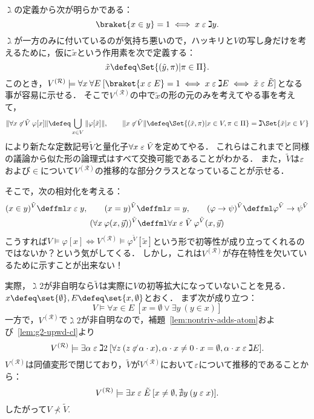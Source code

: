 \documentclass[realisability.tex]{subfiles}
\begin{document}
\begin{remark}
 $\gimel$の定義から次が明らかである：
 \[
  \braket{x \in y} = 1 \iff x \strin \gimel y.
 \]
 $\gimel$が一方のみに付いているのが気持ち悪いので，ハッキリと$V$の写し身だけを考えるために，仮に$\tilde{x}$という作用素を次で定義する：
 \[
  \tilde{x} \defeq \Set{ (\tilde{y}, \pi) | \pi \in \Pi }.
 \]
 このとき，$V^{(\mathcal{R})} \models \forall x \: \forall E \: [\braket{x \strin E} = 1 \iff x \strin \gimel E \iff \tilde{x} \strin \tilde{E}]$となる事が容易に示せる．
 そこで$V^{(\mathcal{R})}$の中で$\tilde{x}$の形の元のみを考えてやる事を考えて，
 \[
  \|\forall x \strnin \tilde{V} \: \varphi[x]\| \defeq
  \bigcup_{x \in V} \|\varphi[\tilde{x}]\|, \qquad
  \| x \strnin \tilde{V}\| \defeq \Set{ (\tilde{x}, \pi) | x \in V, \pi \in \Pi}
  = \gimel\Set{\tilde{x} | x \in V}
 \]
 により新たな定数記号$\tilde{V}$と量化子$\forall x \mathrel{\varepsilon} \tilde{V}$を定めてやる．
 これらはこれまでと同様の議論から似た形の論理式はすべて交換可能であることがわかる．
 また，$\tilde{V}$は$\mathrel{\varepsilon}$および$\in$について$V^{(\mathcal{R})}$の推移的な部分クラスとなっていることが示せる．

 そこで，次の相対化を考える：
 \begin{gather*}
  (x \in y)^{\tilde{V}} \deffml x \strin y, \qquad
  (x = y)^{\tilde{V}} \deffml x = y, \qquad
  (\varphi \to \psi)^{\tilde{V}} \deffml \varphi^{\tilde{V}} \to \psi^{\tilde{V}} \\
  (\forall x \: \varphi(x, \vec{y}))^{\tilde{V}} \deffml
  \forall x \strin \tilde{V} \: \varphi^{\tilde{V}}(x, \vec{y})
 \end{gather*} 
 こうすれば$V \models \varphi[x] \iff V^{(\mathcal{R})} \models \varphi^{\tilde{V}}[\tilde{x}]$という形で初等性が成り立ってくれるのではないか？という気がしてくる．
 しかし，これは$V^{(\mathcal{R})}$が存在特性を欠いているために示すことが出来ない！

 実際，$\gimel 2$が非自明なら$\tilde{V}$は実際に$V$の初等拡大になっていないことを見る．
 $x \defeq \set{\emptyset}, E \defeq \set{ x, \emptyset }$とおく．
 まず次が成り立つ：
 \[
  V \models \forall x \in E \: [x = \emptyset \lor \exists y \: (y \in x)]
 \]
 一方で，$V^{(\mathcal{R})}$で$\gimel 2$が非自明なので，補題~\ref{lem:nontriv-adds-atom}および~\ref{lem:g2-upwd-cl}より
 \[
  V^{(\mathcal{R})} \models \exists \alpha \mathrel{\varepsilon} \gimel 2 \: [\forall z\:(z \not\mathrel{\varepsilon} \alpha \cdot x), \alpha \cdot x \neq 0 \cdot x = \emptyset, \alpha \cdot x \mathrel{\varepsilon} \gimel E].
 \]
 $V^{(\mathcal{R})}$は同値変形で閉じており，$\tilde{V}$が$V^{(\mathcal{R})}$において$\mathrel{\varepsilon}$について推移的であることから：
 \[
  V^{(\mathcal{R})} \models \exists x \mathrel{\varepsilon} \tilde{E}\:[x \neq \emptyset, \nexists y \:(y \mathrel{\varepsilon} x)].
 \]
 したがって$V \not\prec \tilde{V}$.
\end{remark}
\end{document}
